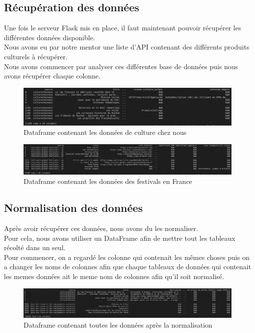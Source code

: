 \documentclass{article}
\begin{document}
\subsection{Récupération des données}
Une fois le serveur Flask mis en place, il faut maintenant pouvoir récupérer les différentes données disponible.\\
Nous avons eu par notre mentor une liste d'API contenant des différents produits culturels à récupérer.\\
Nous avons commencer par analyser ces différentes base de données puis nous avons récupérer chaque colonne.\\
\begin{figure}[H]
\hspace{-25mm}
\includegraphics[scale = 0.44]{images/culturecheznous.png}
\caption{Dataframe contenant les données de culture chez nous}
\end{figure}
\begin{figure}[H]
\hspace{-25mm}
\includegraphics[scale = 0.354]{images/festivals.png}
\caption{Dataframe contenant les données des festivals en France}
\end{figure}

\subsection{Normalisation des données}
Après avoir récupérer ces données, nous avons du les normaliser.\\
Pour cela, nous avons utiliser un DataFrame afin de mettre tout les tableaux récolté dans un seul.\\
Pour commencer, on a regardé les colonne qui contenait les mêmes choses puis on a changer les noms de colonnes afin que chaque tableaux de données qui contenait les memes données ait le meme nom de colonnes afin qu'il soit normalisé.
\begin{figure}[H]
\hspace{-25mm}
\includegraphics[scale = 0.35]{images/dataframe_final.png}
\caption{Dataframe contenant toutes les données après la normalisation}
\end{figure}
\end{document}

